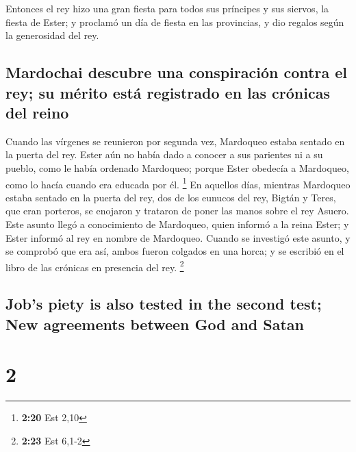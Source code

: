 \begin{paracol}{2}
 Entonces el rey hizo una gran fiesta para todos sus
príncipes y sus siervos, la fiesta de Ester; y proclamó un día de fiesta
en las provincias, y dio regalos según la generosidad del rey.

\hypertarget{mardochai-descubre-una-conspiraciuxf3n-contra-el-rey-su-muxe9rito-estuxe1-registrado-en-las-cruxf3nicas-del-reino}{%
\subsection{Mardochai descubre una conspiración contra el rey; su mérito
está registrado en las crónicas del
reino}\label{mardochai-descubre-una-conspiraciuxf3n-contra-el-rey-su-muxe9rito-estuxe1-registrado-en-las-cruxf3nicas-del-reino}}

 Cuando las vírgenes se reunieron por segunda vez,
Mardoqueo estaba sentado en la puerta del rey.  Ester aún
no había dado a conocer a sus parientes ni a su pueblo, como le había
ordenado Mardoqueo; porque Ester obedecía a Mardoqueo, como lo hacía
cuando era educada por él. \footnote{\textbf{2:20} Est 2,10}
 En aquellos días, mientras Mardoqueo estaba sentado en
la puerta del rey, dos de los eunucos del rey, Bigtán y Teres, que eran
porteros, se enojaron y trataron de poner las manos sobre el rey Asuero.
 Este asunto llegó a conocimiento de Mardoqueo, quien
informó a la reina Ester; y Ester informó al rey en nombre de Mardoqueo.
 Cuando se investigó este asunto, y se comprobó que era
así, ambos fueron colgados en una horca; y se escribió en el libro de
las crónicas en presencia del rey. \footnote{\textbf{2:23} Est 6,1-2}

\switchcolumn
\begin{otherlanguage}{english}

\hypertarget{jobs-piety-is-also-tested-in-the-second-test-new-agreements-between-god-and-satan}{%
\subsection{Job's piety is also tested in the second test; New
agreements between God and
Satan}\label{jobs-piety-is-also-tested-in-the-second-test-new-agreements-between-god-and-satan}}

\hypertarget{section-3}{%
\section{2}\label{section-3}}


\end{otherlanguage}
\end{paracol}

